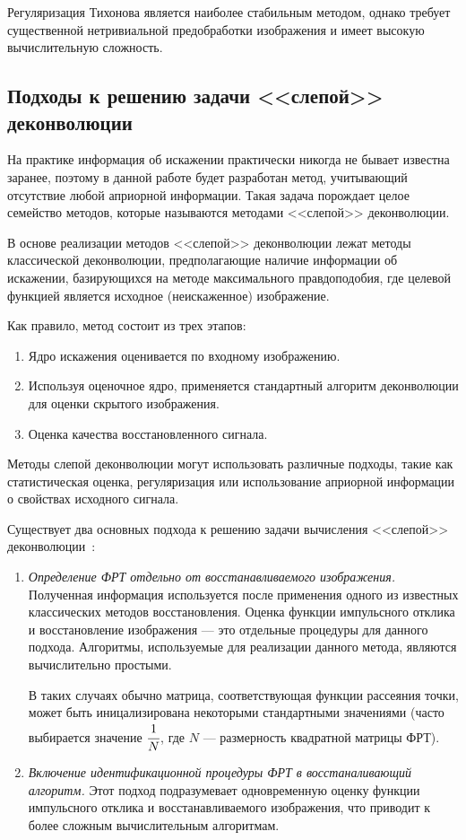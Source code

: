 Регуляризация Тихонова является наиболее стабильным методом, однако требует существенной нетривиальной предобработки изображения и имеет высокую вычислительную сложность.

\subsection{Подходы к решению задачи <<слепой>> деконволюции}

На практике информация об искажении практически никогда не бывает известна заранее, поэтому в данной работе будет разработан метод, учитывающий отсутствие любой априорной информации. Такая задача порождает целое семейство методов, которые называются методами <<слепой>> деконволюции. 


В основе реализации методов <<слепой>> деконволюции лежат методы классической деконволюции, предполагающие наличие информации об искажении, базирующихся на методе максимального правдоподобия, где целевой функцией является исходное (неискаженное) изображение.

Как правило, метод состоит из трех этапов: 

\begin{enumerate}
	\item Ядро искажения оценивается по входному изображению.
	\item Используя оценочное ядро, применяется стандартный алгоритм деконволюции для оценки скрытого изображения.
	\item Оценка качества восстановленного сигнала.
\end{enumerate}

Методы слепой деконволюции могут использовать различные подходы, такие как статистическая оценка, регуляризация или использование априорной информации о свойствах исходного сигнала.

Существует два основных подхода к решению задачи вычисления <<слепой>> деконволюции~\cite{blind_def}:

\begin{enumerate}
	\item \textit{Определение ФРТ отдельно от восстанавливаемого изображения.} Полученная информация используется после применения одного из известных классических методов восстановления. Оценка функции импульсного отклика и восстановление изображения --- это отдельные процедуры для данного подхода. Алгоритмы, используемые для реализации данного метода, являются вычислительно простыми. 
	
	В таких случаях обычно матрица, соответствующая функции рассеяния точки, может быть иницализирована некоторыми стандартными значениями (часто выбирается значение $\cfrac{1}{N}$, где $N$ --- размерность квадратной матрицы ФРТ).  
	
	\item \textit{Включение идентификационной процедуры ФРТ в восстаналивающий алгоритм.} Этот подход подразумевает одновременную оценку функции импульсного отклика и восстанавливаемого изображения, что приводит к более сложным вычислительным алгоритмам.
\end{enumerate}


